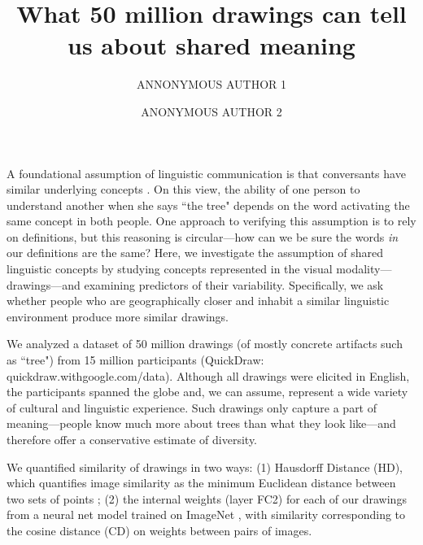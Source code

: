 \documentclass{evolang12}
\begin{document}
\title{What 50 million drawings can tell us about shared meaning}
\author[*1,2]{ANNONYMOUS AUTHOR 1}
\author[1]{ANONYMOUS AUTHOR 2}

\maketitle

A foundational assumption of linguistic communication is that conversants have similar underlying concepts \cite{brennan1996conceptual,wierzbicka2012understanding}. On this view, the ability of one person to understand another when she says ``the tree" depends on the word activating the same concept in both people. One approach to verifying this assumption is to rely on definitions, but this reasoning is circular---how can we be sure the words {\it in} our definitions are the same? Here, we investigate the assumption of shared linguistic concepts by studying concepts represented in the visual modality---drawings---and examining predictors of their variability. Specifically, we ask whether people who are geographically closer and inhabit a similar linguistic environment produce more similar drawings.

We analyzed a dataset of 50 million drawings (of mostly concrete artifacts such as ``tree") from 15 million participants (QuickDraw: quickdraw.withgoogle.com/data). Although all drawings were elicited in English, the participants spanned the globe and, we can assume, represent a wide variety of cultural and linguistic experience. Such drawings only capture a part of meaning---people know much more about trees than what they look like---and therefore offer a conservative estimate of diversity.

We quantified similarity of drawings in two ways: (1) Hausdorff Distance (HD), which quantifies image similarity as the minimum Euclidean distance between two sets of points \cite{Huttenlocher93comparingimages}; (2) the internal weights (layer FC2) for each of our drawings from a neural net model trained on ImageNet \cite{deng2009imagenet}, with similarity corresponding to the cosine distance (CD) on weights between pairs of images. 
\end{document}
